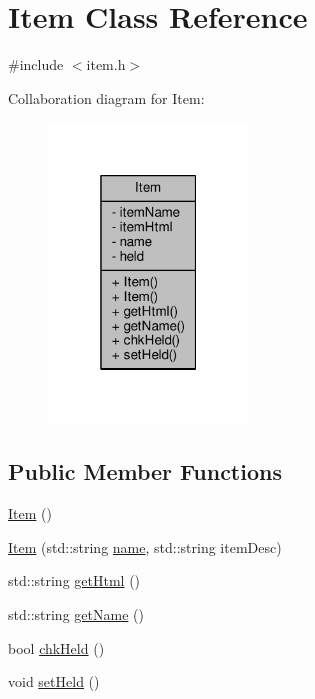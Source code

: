 \hypertarget{class_item}{}\section{Item Class Reference}
\label{class_item}


{\ttfamily \#include $<$item.\+h$>$}



Collaboration diagram for Item\+:
\nopagebreak
\begin{figure}[H]
\begin{center}
\leavevmode
\includegraphics[width=151pt]{class_item__coll__graph}
\end{center}
\end{figure}
\subsection*{Public Member Functions}
\begin{DoxyCompactItemize}
\item 
\hyperlink{class_item_a297720c02984eab37332ae795d22189d}{Item} ()
\item 
\hyperlink{class_item_ab6fbcff91764911e1af1f9a6384b8472}{Item} (std\+::string \hyperlink{class_item_a342b7a351c9ae1c5430aa3ef65b670bd}{name}, std\+::string item\+Desc)
\item 
std\+::string \hyperlink{class_item_a34a7a862e03a25e685bc9d6de8bde908}{get\+Html} ()
\item 
std\+::string \hyperlink{class_item_a4ff297b946505e7956eae16006cada04}{get\+Name} ()
\item 
bool \hyperlink{class_item_ac2ea634d1693b729328307e4a40dbe7a}{chk\+Held} ()
\item 
void \hyperlink{class_item_af3e1688046b6145d02a42eba8443d36d}{set\+Held} ()
\end{DoxyCompactItemize}

